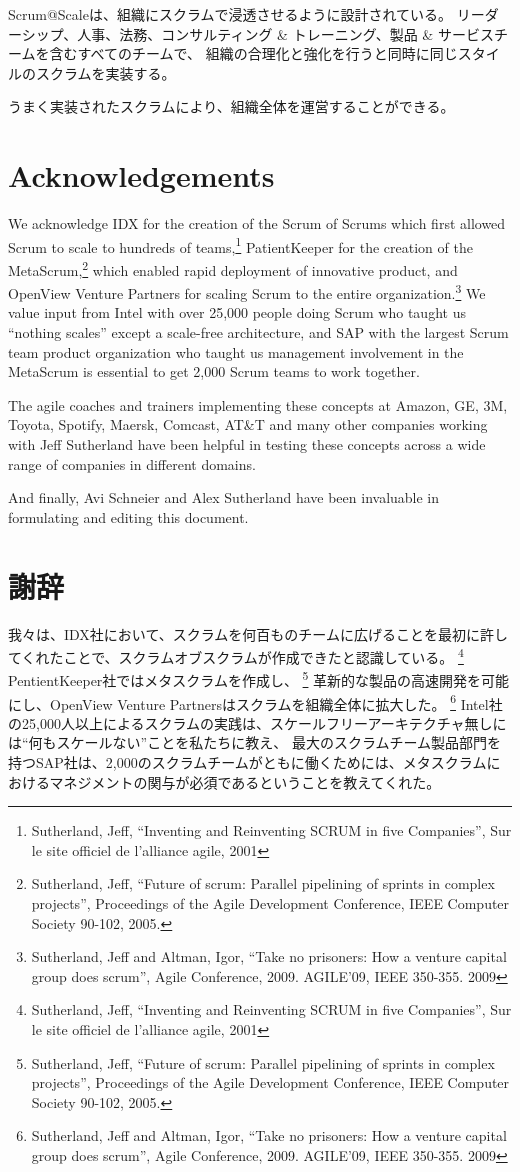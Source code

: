 \documentclass[12pt,a4paper,parskip=full]{scrartcl}
\begin{document}
Scrum@Scaleは、組織にスクラムで浸透させるように設計されている。
リーダーシップ、人事、法務、コンサルティング \& トレーニング、製品 \& サービスチームを含むすべてのチームで、
組織の合理化と強化を行うと同時に同じスタイルのスクラムを実装する。

うまく実装されたスクラムにより、組織全体を運営することができる。
\section{Acknowledgements}
We acknowledge IDX for the creation of the Scrum of Scrums which first
allowed Scrum to scale to hundreds of teams,\footnote{Sutherland, Jeff,
``Inventing and Reinventing SCRUM in five Companies'', Sur le site officiel
de l'alliance agile, 2001} PatientKeeper for the creation of the
MetaScrum,\footnote{Sutherland, Jeff, ``Future of scrum: Parallel pipelining
of sprints in complex projects'', Proceedings of the Agile Development
Conference,  IEEE Computer Society 90-102,  2005.} which enabled rapid
deployment of innovative product, and OpenView Venture Partners for scaling
Scrum to the entire organization.\footnote{Sutherland, Jeff and Altman,
Igor, ``Take no prisoners: How a venture capital group does scrum'', Agile
Conference, 2009. AGILE'09, IEEE 350-355.  2009} We value input from Intel
with over 25,000 people doing Scrum who taught us ``nothing scales'' except
a scale-free architecture, and SAP with the largest Scrum team product
organization who taught us management involvement in the MetaScrum is
essential to get 2,000 Scrum teams to work together.

The agile coaches and trainers implementing these concepts at Amazon, GE,
3M, Toyota, Spotify, Maersk, Comcast, AT\&T and many other companies working with Jeff Sutherland
have been helpful in testing these concepts across a wide range of
companies in different domains.

And finally, Avi Schneier and Alex Sutherland have been invaluable in
formulating and editing this document.
\fi
\section{謝辞}
我々は、IDX社において、スクラムを何百ものチームに広げることを最初に許してくれたことで、スクラムオブスクラムが作成できたと認識している。
\footnote{Sutherland, Jeff, ``Inventing and Reinventing SCRUM in five Companies'', Sur le site officiel de l'alliance agile, 2001} 
PentientKeeper社ではメタスクラムを作成し、
\footnote{Sutherland, Jeff, ``Future of scrum: Parallel pipelining of sprints in complex projects'', Proceedings of the Agile Development Conference,  IEEE Computer Society 90-102,  2005.} 
革新的な製品の高速開発を可能にし、OpenView Venture Partnersはスクラムを組織全体に拡大した。
\footnote{Sutherland, Jeff and Altman, Igor, ``Take no prisoners: How a venture capital group does scrum'', Agile Conference, 2009. AGILE'09, IEEE 350-355.  2009} 
Intel社の25,000人以上によるスクラムの実践は、スケールフリーアーキテクチャ無しには``何もスケールない''ことを私たちに教え、
最大のスクラムチーム製品部門を持つSAP社は、2,000のスクラムチームがともに働くためには、メタスクラムにおけるマネジメントの関与が必須であるということを教えてくれた。
\end{document}
